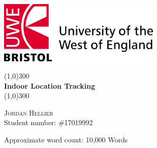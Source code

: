\begin{titlepage}

		\includegraphics[height=3cm]{./images/uwe_logo.jpg}
		\vspace{25mm}

	\begin{center}
		\line(1,0){300}\\
		[5mm]
		\huge{\bfseries Indoor Location Tracking}\\
		[2mm]
		\line(1,0){300}\\
		[10cm]
	\end{center}
	
	\begin{flushright}
	\textsc{\Large Jordan Hellier}\\
	Student number: \#17019992\\
	[1cm]
	\end{flushright}
	\begin{flushright}
		Approximate word count: 10,000 Words
	\end{flushright}
\end{titlepage}
